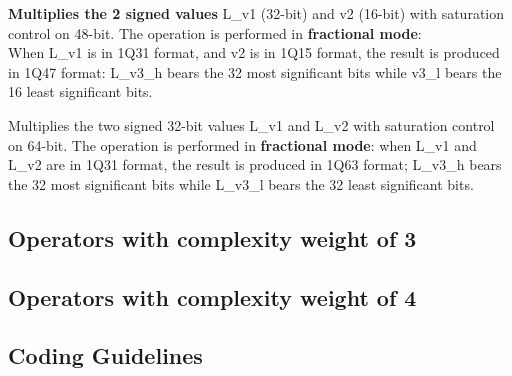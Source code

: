 
\textbf{Multiplies the 2 signed values} L\_v1 (32-bit) and v2 (16-bit) with saturation control on 48-bit.
The operation is performed in \textbf{fractional mode}: \\
When L\_v1 is in 1Q31 format, and v2 is in 1Q15 format, the result is produced in 1Q47 format: L\_v3\_h bears the 32 most significant bits while v3\_l bears the 16 least significant bits.


Multiplies the two signed 32-bit values L\_v1 and L\_v2 with saturation control on 64-bit.
The operation is performed in \textbf{fractional mode}: when L\_v1 and L\_v2 are in 1Q31 format, the result is produced in 1Q63 format; L\_v3\_h bears the 32 most significant bits while L\_v3\_l bears the 32 least significant bits.

\subsection{Operators with complexity weight of 3}


\subsection{Operators with complexity weight of 4}



\subsection{Coding Guidelines}


